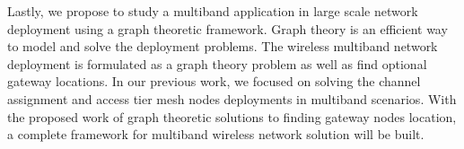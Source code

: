 Lastly, we propose to study a multiband application in large 
scale network deployment using a graph theoretic framework.
Graph theory is an efficient way to model and solve 
the deployment problems. The wireless multiband network deployment is formulated
as a graph theory problem as well as find optional gateway locations.
In our previous work,
we focused on solving the channel assignment and access tier mesh nodes deployments
in multiband scenarios. With the proposed work of graph theoretic solutions to finding gateway nodes
location, a complete framework for multiband wireless network solution will be 
built. 

